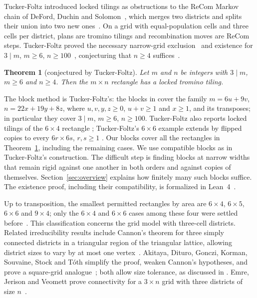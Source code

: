 \documentclass[11pt]{article}
\newtheorem{theorem}{Theorem}
\theoremstyle{definition}
\theoremstyle{remark}
\begin{document}
Tucker-Foltz introduced locked tilings as obstructions to the ReCom Markov
chain of DeFord, Duchin and Solomon~\cite{recom}, which merges two districts
and splits their union into two new ones~\cite[Section~1]{tf}. On a grid
with equal-population cells and three cells per district, plans are tromino
tilings and recombination moves are ReCom steps. Tucker-Foltz proved the
necessary narrow-grid exclusion~\cite[Theorem~3.1]{tf} and existence for
$3\mid m$, $m\ge6$, $n\ge100$~\cite[Theorem~3.2]{tf}, conjecturing that
$n\ge4$ suffices~\cite[Section~3]{tf}.

\begin{theorem}[conjectured by Tucker-Foltz]\label{thm:conj}
Let $m$ and $n$ be integers with $3\mid m$, $m\ge6$ and $n\ge4$. Then the
$m\times n$ rectangle has a locked tromino tiling.
\end{theorem}

The block method is Tucker-Foltz's: the blocks in
\cite[Figure~7 and proof of Theorem~3.2]{tf} cover the family
$m=6u+9v$, $n=22x+19y+8z$, where $u,v,y,z\ge0$, $u+v\ge1$ and $x\ge1$,
and its transposes; in particular they cover $3\mid m$, $m\ge6$, $n\ge100$.
Tucker-Foltz also reports locked tilings of the $6\times4$ rectangle
\cite[Section~3]{tf}; Tucker-Foltz's $6\times6$ example extends by flipped copies
to every $6r\times6s$, $r,s\ge1$ \cite[Section~1, Figures~2--3]{tf}. Our blocks cover all the
rectangles in Theorem~\ref{thm:conj}, including the remaining cases. We use
compatible blocks as in Tucker-Foltz's construction. The difficult step
is finding blocks at narrow widths that remain rigid against one another
in both orders and against copies of themselves. Section~\ref{sec:overview}
explains how finitely many such blocks suffice. The existence proof,
including their compatibility, is formalized in Lean~4~\cite{lean}.

Up to transposition, the smallest permitted rectangles by area are $6\times4$,
$6\times5$, $6\times6$ and $9\times4$; only the $6\times4$ and $6\times6$
cases among these four were settled before~\cite[Sections~1 and~3]{tf}. This classification concerns
the grid model with three-cell districts. Related irreducibility results
include Cannon's theorem for three simply connected districts in a
triangular region of the triangular lattice, allowing district sizes to
vary by at most one vertex~\cite{cannon}. Akitaya, Dituro, Gonczi,
Korman, Souvaine, Stock and T\'oth simplify the proof, weaken Cannon's
hypotheses, and prove a square-grid analogue~\cite{akitaya}; both allow
size tolerance, as discussed in \cite[Section~1.2]{emre}. Emre, Jerison
and Veomett prove connectivity for a $3\times n$ grid with three
districts of size $n$~\cite[Theorem~3]{emre}.
\end{document}
